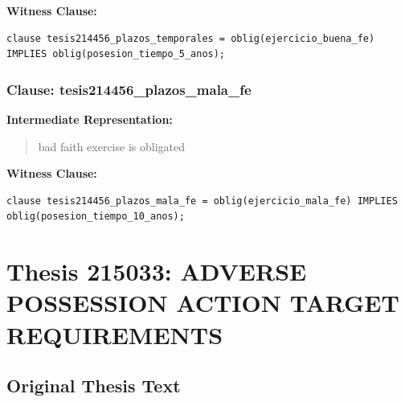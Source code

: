 \documentclass[11pt,a4paper]{article}
\begin{document}
\textbf{Witness Clause:}

\begin{lstlisting}[style=witnessstyle, language=Witness]
clause tesis214456_plazos_temporales = oblig(ejercicio_buena_fe) IMPLIES oblig(posesion_tiempo_5_anos);
\end{lstlisting}

\subsubsection{Clause: tesis214456\_plazos\_mala\_fe}

\textbf{Intermediate Representation:}

\begin{quote}
bad faith exercise is obligated
\end{quote}

\textbf{Witness Clause:}

\begin{lstlisting}[style=witnessstyle, language=Witness]
clause tesis214456_plazos_mala_fe = oblig(ejercicio_mala_fe) IMPLIES oblig(posesion_tiempo_10_anos);
\end{lstlisting}

\newpage

\section{Thesis 215033: ADVERSE POSSESSION ACTION TARGET REQUIREMENTS}
\label{thesis:215033}

\subsection{Original Thesis Text}
\end{document}
